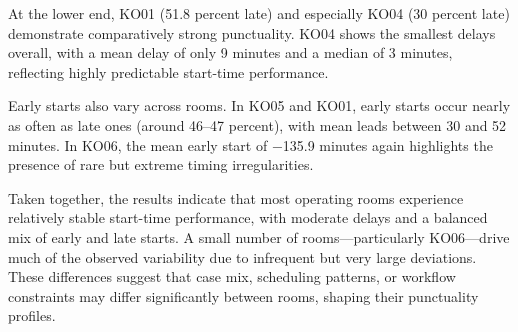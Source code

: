 \documentclass[
]{article}
\begin{document}
At the lower end, KO01 (51.8 percent late) and especially KO04 (30
percent late) demonstrate comparatively strong punctuality. KO04 shows
the smallest delays overall, with a mean delay of only 9 minutes and a
median of 3 minutes, reflecting highly predictable start-time
performance.

Early starts also vary across rooms. In KO05 and KO01, early starts
occur nearly as often as late ones (around 46--47 percent), with mean
leads between 30 and 52 minutes. In KO06, the mean early start of −135.9
minutes again highlights the presence of rare but extreme timing
irregularities.

Taken together, the results indicate that most operating rooms
experience relatively stable start-time performance, with moderate
delays and a balanced mix of early and late starts. A small number of
rooms---particularly KO06---drive much of the observed variability due
to infrequent but very large deviations. These differences suggest that
case mix, scheduling patterns, or workflow constraints may differ
significantly between rooms, shaping their punctuality profiles.
\end{document}
